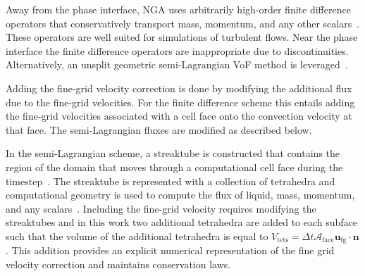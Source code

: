 Away from the phase interface, NGA uses arbitrarily high-order finite difference operators that conservatively transport mass, momentum, and any other scalars~\cite{NGA2}.  These operators are well suited for simulations of turbulent flows.  Near the phase interface the finite difference operators are inappropriate due to discontinuities.  Alternatively, an unsplit geometric semi-Lagrangian VoF method is leveraged~\cite{Owkes2017,Owkes2014}.

Adding the fine-grid velocity correction is done by modifying the additional flux due to the fine-grid velocities.  For the finite difference scheme this entails adding the fine-grid velocities associated with a cell face onto the convection velocity at that face.  The semi-Lagrangian fluxes are modified as described below.

In the semi-Lagrangian scheme, a streaktube is constructed that contains the region of the domain that moves through a computational cell face during the timestep~\cite{Owkes2017}.  The streaktube is represented with a collection of tetrahedra and computational geometry is used to compute the flux of liquid, mass, momentum, and any scalars~\cite{Owkes2017}. Including the fine-grid velocity requires modifying the streaktubes and in this work two additional tetrahedra are added to each subface such that the volume of the additional tetrahedra is equal to $V_\text{tets}=\Delta t \mathcal{A}_\text{face} \bm{u}_\text{fg}\cdot\bm{n}$. This addition provides an explicit numerical representation of the fine grid velocity correction and maintains conservation laws. 




















